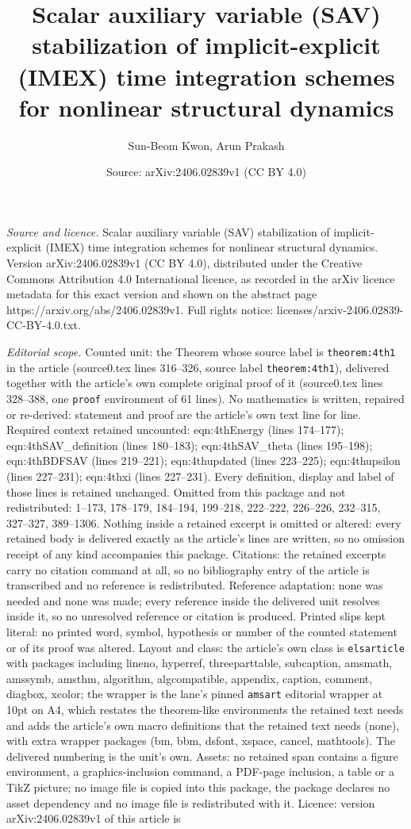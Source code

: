 \documentclass[10pt,a4paper]{amsart}
\title[Scalar auxiliary variable (SAV) stabilization of implicit-ex]{Scalar auxiliary variable (SAV) stabilization of implicit-explicit (IMEX) time integration schemes for nonlinear structural dynamics}
\author{Sun-Beom Kwon, Arun Prakash}
\date{Source: arXiv:2406.02839v1 (CC BY 4.0)}
\begin{document}
\maketitle

\noindent\emph{Source and licence.} Scalar auxiliary variable (SAV) stabilization of implicit-explicit (IMEX) time integration schemes for nonlinear structural dynamics. Version arXiv:2406.02839v1 (CC BY 4.0), distributed under the Creative Commons Attribution 4.0 International licence, as recorded in the arXiv licence metadata for this exact version and shown on the abstract page https://arxiv.org/abs/2406.02839v1. Full rights notice: licenses/arxiv-2406.02839-CC-BY-4.0.txt.\par\smallskip

\noindent\textit{Editorial scope.} Counted unit: the Theorem whose source label is \texttt{theorem:4th1} in the article (source0.tex lines 316--326, source label \texttt{theorem:4th1}), delivered together with the article's own complete original proof of it (source0.tex lines 328--388, one \texttt{proof} environment of 61 lines). No mathematics is written, repaired or re-derived: statement and proof are the article's own text line for line. Required context retained uncounted: eqn:4thEnergy (lines 174--177); eqn:4thSAV\_definition (lines 180--183); eqn:4thSAV\_theta (lines 195--198); eqn:4thBDFSAV (lines 219--221); eqn:4thupdated (lines 223--225); eqn:4thupsilon (lines 227--231); eqn:4thxi (lines 227--231). Every definition, display and label of those lines is retained unchanged. Omitted from this package and not redistributed: 1--173, 178--179, 184--194, 199--218, 222--222, 226--226, 232--315, 327--327, 389--1306. Nothing inside a retained excerpt is omitted or altered: every retained body is delivered exactly as the article's lines are written, so no omission receipt of any kind accompanies this package. Citations: the retained excerpts carry no citation command at all, so no bibliography entry of the article is transcribed and no reference is redistributed. Reference adaptation: none was needed and none was made; every reference inside the delivered unit resolves inside it, so no unresolved reference or citation is produced. Printed slips kept literal: no printed word, symbol, hypothesis or number of the counted statement or of its proof was altered. Layout and class: the article's own class is \texttt{elsarticle} with packages including lineno, hyperref, threeparttable, subcaption, amsmath, amssymb, amsthm, algorithm, algcompatible, appendix, caption, comment, diagbox, xcolor; the wrapper is the lane's pinned \texttt{amsart} editorial wrapper at 10pt on A4, which restates the theorem-like environments the retained text needs and adds the article's own macro definitions that the retained text needs (none), with extra wrapper packages (bm, bbm, dsfont, xspace, cancel, mathtools). The delivered numbering is the unit's own. Assets: no retained span contains a figure environment, a graphics-inclusion command, a PDF-page inclusion, a table or a TikZ picture; no image file is copied into this package, the package declares no asset dependency and no image file is redistributed with it. Licence: version arXiv:2406.02839v1 of this article is 
\end{document}
